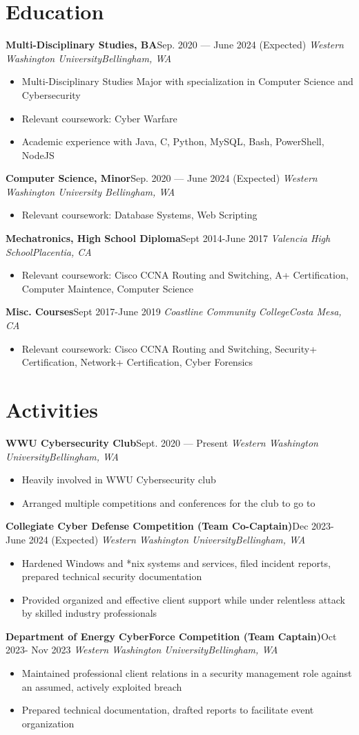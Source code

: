 \documentclass{article}
\newcommand{\topLevelItem}[4]{
    \textbf{#1}\hfill #4\newline
    \emph{#2\hfill #3}\newline
    \vspace{-18pt}\begin{itemize}
}
\newcommand{\topLevelItemEnd}{\end{itemize}\vspace{5pt}}
\newcommand{\lowLevelItem}[1]{
    \item\small{#1}\vspace{-8pt}
}
\begin{document}
    \section*{Education}
        \topLevelItem{Multi-Disciplinary Studies, BA}{Western Washington University}{Bellingham, WA}{Sep. 2020 — June 2024 (Expected)}
            \lowLevelItem{Multi-Disciplinary Studies Major with specialization in Computer Science and Cybersecurity}
            \lowLevelItem{Relevant coursework: Cyber Warfare}
            \lowLevelItem{Academic experience with Java, C, Python, MySQL, Bash, PowerShell, NodeJS}
        \topLevelItemEnd
        \topLevelItem{Computer Science, Minor}{Western Washington University }{Bellingham, WA}{Sep. 2020 — June 2024 (Expected)}
            \lowLevelItem{Relevant coursework: Database Systems, Web Scripting}
        \topLevelItemEnd
        \topLevelItem{Mechatronics, High School Diploma}{Valencia High School}{Placentia, CA}{Sept 2014-June 2017}
            \lowLevelItem{Relevant coursework: Cisco CCNA Routing and Switching, A+ Certification, Computer Maintence, Computer Science}
        \topLevelItemEnd
        \topLevelItem{Misc. Courses}{Coastline Community College}{Costa Mesa, CA}{Sept 2017-June 2019}
            \lowLevelItem{Relevant coursework: Cisco CCNA Routing and Switching, Security+ Certification, Network+ Certification, Cyber Forensics}
        \topLevelItemEnd
        
    \section*{Activities}
        \topLevelItem{WWU Cybersecurity Club}{Western Washington University}{Bellingham, WA}{Sept. 2020 — Present}
            \lowLevelItem{Heavily involved in WWU Cybersecurity club}
            \lowLevelItem{Arranged multiple competitions and conferences for the club to go to}
        \topLevelItemEnd
        \topLevelItem{Collegiate Cyber Defense Competition (Team Co-Captain)}{Western Washington University}{Bellingham, WA}{Dec 2023-June 2024 (Expected)}
            \lowLevelItem{Hardened Windows and *nix systems and services, filed incident reports, prepared technical security documentation}
            \lowLevelItem{Provided organized and effective client support while under relentless attack by skilled industry professionals}
        \topLevelItemEnd
        \topLevelItem{Department of Energy CyberForce Competition (Team Captain)}{Western Washington University}{Bellingham, WA}{Oct 2023- Nov 2023}
            \lowLevelItem{Maintained professional client relations in a security management role against an assumed, actively exploited breach}
            \lowLevelItem{Prepared technical documentation, drafted reports to facilitate event organization}
        \topLevelItemEnd
        
\end{document}
